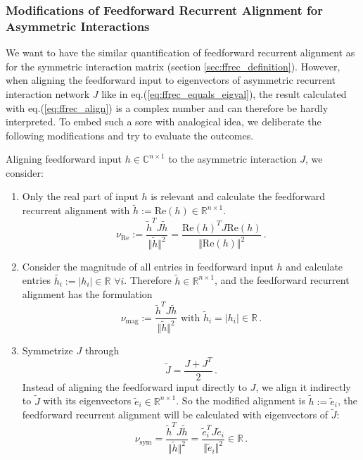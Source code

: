 \documentclass[11pt]{article}
\begin{document}
	\subsubsection{Modifications of Feedforward Recurrent Alignment for Asymmetric Interactions} \label{sec:modify_ffrec_alignment_score}
	We want to have the similar quantification of feedforward recurrent alignment as for the symmetric interaction matrix (section \ref{sec:ffrec_definition}). However, when aligning the feedforward input to eigenvectors of asymmetric recurrent interaction network $J$ like in eq.(\ref{eq:ffrec_equals_eigval}), the result calculated with eq.(\ref{eq:ffrec_align}) is a complex number and can therefore be hardly interpreted. To embed such a sore with analogical idea, we deliberate the following modifications and try to evaluate the outcomes. 
	
	Aligning feedforward input $h \in \mathbb{C}^{n \times 1}$ to the asymmetric interaction $J$, we consider:
		\begin{enumerate}
			\item \label{sec:modicication_real_part} Only the real part of input $h$ is relevant and calculate the feedforward recurrent alignment with $\tilde{h} := \text{Re}(h) \in \mathbb{R}^{n \times 1}$.
				\begin{equation} \label{eq:ffrec_real_part}
					\nu_{\text{Re}} := \frac{\tilde{h}^T J \tilde{h}}{\Vert \tilde{h} \Vert^2} = \frac{\text{Re}(h)^T J \text{Re}(h)}{\Vert \text{Re}(h)\Vert^2} \, .
				\end{equation}
			\item \label{sec:modification_magnitude} Consider the magnitude of all entries in feedforward input $h$ and calculate entries $\tilde{h_i} := \vert h_i \vert \in \mathbb{R} \, \, \forall i$. Therefore $\tilde{h} \in \mathbb{R}^{n \times 1}$, and the feedforward recurrent alignment has the formulation
				\begin{equation} \label{eq:ffrec_mag}
					\nu_{\text{mag}} := \frac{\tilde{h}^T J \tilde{h}}{\Vert \tilde{h} \Vert^2} \text{ with } \tilde{h}_i = \vert h_i \vert \in \mathbb{R} \, .
				\end{equation}
			\item \label{sec:modification_symmetrized} Symmetrize $J$ through
				\begin{equation} \label{eq:symmetrized_J}
					\tilde{J} = \frac{J + J^T}{2} \, .
				\end{equation}
				Instead of aligning the feedforward input directly to $J$, we align it indirectly to $\tilde{J}$ with its eigenvectors $\tilde{e}_i \in \mathbb{R}^{n \times 1}$. So the modified alignment is $\tilde{h} := \tilde{e}_i $, the feedforward recurrent alignment will be calculated with eigenvectors of $\tilde{J}$:
				\begin{equation} \label{eq:ffrec_symmetrized}
					\nu_{\text{sym}} =  \frac{\tilde{h}^T J \tilde{h}}{\Vert \tilde{h} \Vert^2} = \frac{\tilde{e}_i^T J \tilde{e}_i}{\Vert \tilde{e}_i \Vert^2} \in \mathbb{R} \, .
				\end{equation}
		\end{enumerate}
	
\end{document}
